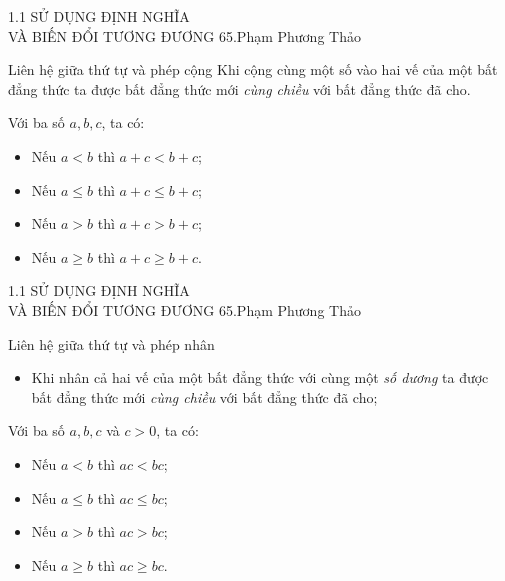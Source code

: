\begin{frame}{1.1 SỬ DỤNG ĐỊNH NGHĨA \\ VÀ BIẾN ĐỔI TƯƠNG ĐƯƠNG \hspace{3cm}  65.Phạm Phương Thảo}
\begin{block}{Liên hệ giữa thứ tự và phép cộng}
\pause
Khi cộng cùng một số vào hai vế của một bất đẳng thức ta được bất đẳng thức mới \textit{cùng chiều} với bất đẳng thức đã cho. 
\end{block} 
\pause
Với ba số $a, b, c$, ta có:
\begin{itemize}
    \item Nếu $a<b$ thì $a+c<b+c$;
    \item Nếu $a\leq b$ thì $a+c \leq b+c$;
    \item Nếu $a>b$ thì $a+c>b+c$;
    \item Nếu $a\geq b$ thì $a+c\geq b+c$.
\end{itemize}
\end{frame}

\begin{frame}{1.1 SỬ DỤNG ĐỊNH NGHĨA \\ VÀ BIẾN ĐỔI TƯƠNG ĐƯƠNG \hspace{3cm}  65.Phạm Phương Thảo}
\begin{block}{Liên hệ giữa thứ tự và phép nhân}
\begin{itemize}
    \item Khi nhân cả hai vế của một bất đẳng thức với cùng một \textit{số dương} ta được bất đẳng thức mới \textit{cùng chiều} với bất đẳng thức đã cho; 
\end{itemize}
\end{block}
\pause
Với ba số $a, b, c$ và $c>0$, ta có:
\begin{itemize}
    \item Nếu $a<b$ thì $ac<bc$;
    \item Nếu $a\leq b$ thì $ac \leq bc$;
    \item Nếu $a>b$ thì $ac>bc$;
    \item Nếu $a\geq b$ thì $ac\geq bc$.
\end{itemize}
\end{frame}

